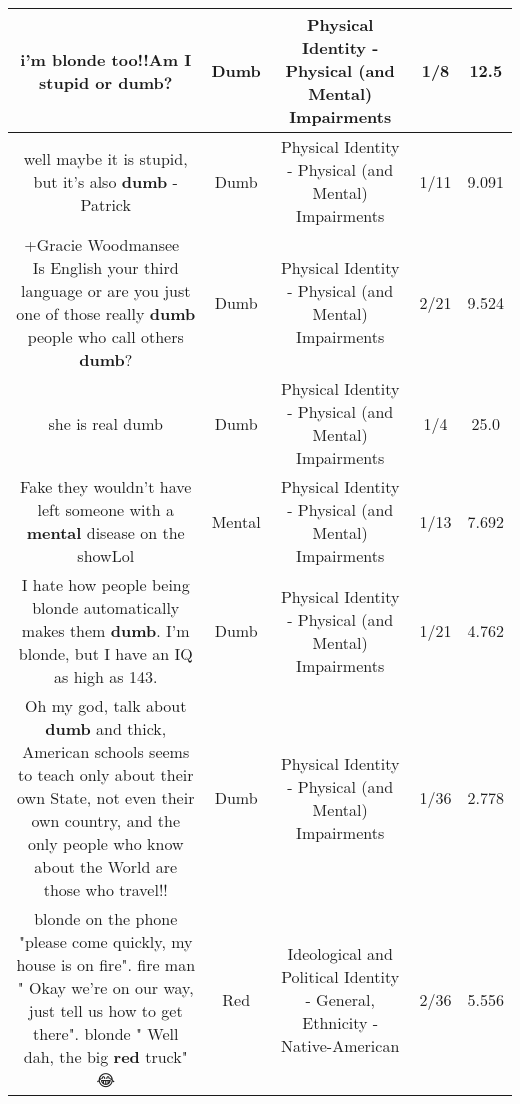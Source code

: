 \documentclass[11pt]{article}
\newlength\mylength
\begin{document}
\begin{center}
\begin{longtable}{|C{.65\mylength}|C{.30\mylength}|C{.12\mylength}|C{.12\mylength}|C{.12\mylength}|}
  \small i'm blonde too!!Am I stupid or \textbf{dumb}?\normalsize   & Dumb & Physical Identity - Physical (and Mental) Impairments & 1/8 & 12.5 \\  \hline
  \small well maybe it is stupid, but it's also \textbf{dumb} - Patrick\normalsize   & Dumb & Physical Identity - Physical (and Mental) Impairments & 1/11 & 9.091 \\  \hline
  \small +Gracie Woodmansee  Is English your third language or are you just one of those really \textbf{dumb} people who call others \textbf{dumb}?\normalsize   & Dumb & Physical Identity - Physical (and Mental) Impairments & 2/21 & 9.524 \\  \hline
  \small she is real dumb\normalsize   & Dumb & Physical Identity - Physical (and Mental) Impairments & 1/4 & 25.0 \\  \hline
  \small Fake they wouldn't have left someone with a \textbf{mental} disease on the showLol\normalsize   & Mental & Physical Identity - Physical (and Mental) Impairments & 1/13 & 7.692 \\  \hline
  \small I hate how people being blonde automatically makes them \textbf{dumb}. I'm blonde, but I have an IQ as high as 143.\normalsize   & Dumb & Physical Identity - Physical (and Mental) Impairments & 1/21 & 4.762 \\  \hline
  \small Oh my god, talk about \textbf{dumb} and thick, American schools seems to teach only about their own State, not even their own country, and the only people who know about the World are those who travel!!\normalsize   & Dumb & Physical Identity - Physical (and Mental) Impairments & 1/36 & 2.778 \\  \hline
  \small blonde on the phone "please come quickly, my house is on fire".    fire man " Okay we're on our way, just tell us how to get there".   blonde " Well dah, the big \textbf{r\textbf{ed}} truck" 😂\normalsize   & Red &  Ideological and Political Identity - General, Ethnicity - Native-American & 2/36 & 5.556 \\  \hline

\end{longtable}
\end{center}
\end{document}
